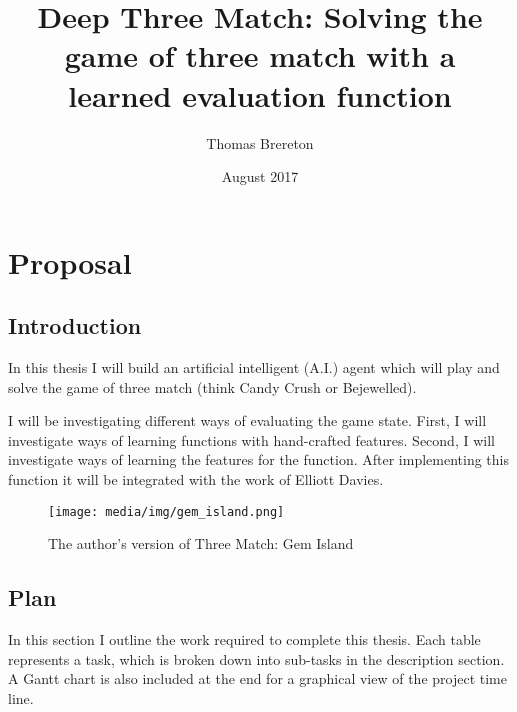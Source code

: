 \documentclass{bhamthesis}
\title{Deep Three Match: Solving the game of three match with a learned evaluation function}
\author{Thomas Brereton}
\date{August 2017}  %
\makeatletter
\theoremstyle{definition}
\newcommand{\makecrestcover}{%
\begin{titlepage}
\centering\singlespacing
\vspace*{1cm}
{\huge\bfseries University of Birmingham\par}
\vspace*{2cm}
\texttt{[image: media/img/crest]}\par
\vspace*{\stretch{1}}
{\Huge\bfseries
\@author\par
\vspace{1cm}
\@title\par}
\vspace*{\stretch{1}}
{\Large\@date\par}
\end{titlepage}
}
\makeatother
\begin{document}
\frontmatter

\maketitle



\mainmatter
\chapter{Proposal}
\section{Introduction}
In this thesis I will build an artificial intelligent (A.I.) agent which will play and solve the game of three match (think Candy Crush or Bejewelled).

I will be investigating different ways of evaluating the game state. First, I will investigate ways of learning functions with hand-crafted features. Second, I will investigate ways of learning the features for the function. After implementing this function it will be integrated with the work of Elliott Davies.

\begin{figure}
\begin{center}
\texttt{[image: media/img/gem\_island.png]} 
\caption{The author's version of Three Match: Gem Island}
\label{f.gemisland}
\end{center}
\end{figure}



\section{Plan}

In this section I outline the work required to complete this thesis. Each table represents a task, which is broken down into sub-tasks in the description section. A Gantt chart is also included at the end for a graphical view of the project time line.
\end{document}

